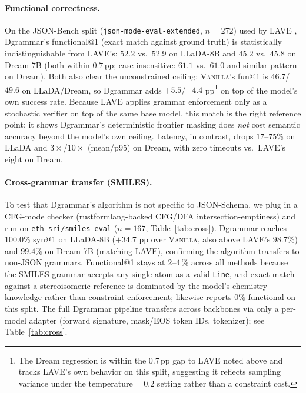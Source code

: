 \documentclass[11pt]{article}
\begin{document}
\paragraph{Functional correctness.} On the JSON-Bench split (\texttt{json-mode-eval-extended}, $n{=}272$) used by LAVE \citep{lave2025}, Dgrammar's functional@1 (exact match against ground truth) is statistically indistinguishable from LAVE's: $52.2$ vs.\ $52.9$ on LLaDA-8B and $45.2$ vs.\ $45.8$ on Dream-7B (both within $0.7$\,pp; case-insensitive: $61.1$ vs.\ $61.0$ and similar pattern on Dream). Both also clear the unconstrained ceiling: \textsc{Vanilla}'s fun@1 is $46.7$/$49.6$ on LLaDA/Dream, so Dgrammar adds $+5.5$/$-4.4$ pp\footnote{The Dream regression is within the $0.7$\,pp gap to LAVE noted above and tracks LAVE's own behavior on this split, suggesting it reflects sampling variance under the temperature$=$$0.2$ setting rather than a constraint cost.} on top of the model's own success rate. Because LAVE applies grammar enforcement only as a stochastic verifier on top of the same base model, this match is the right reference point: it shows Dgrammar's deterministic frontier masking does \emph{not} cost semantic accuracy beyond the model's own ceiling. Latency, in contrast, drops $17$--$75$\% on LLaDA and $3\times$/$10\times$ (mean/p95) on Dream, with zero timeouts vs.\ LAVE's eight on Dream.

\paragraph{Cross-grammar transfer (SMILES).} To test that Dgrammar's algorithm is not specific to JSON-Schema, we plug in a CFG-mode checker (rustformlang-backed CFG/DFA intersection-emptiness) and run on \texttt{eth-sri/smiles-eval} ($n{=}167$, Table~\ref{tab:cross}). Dgrammar reaches $100.0$\% syn@1 on LLaDA-8B ($+34.7$ pp over \textsc{Vanilla}, also above LAVE's $98.7$\%) and $99.4$\% on Dream-7B (matching LAVE), confirming the algorithm transfers to non-JSON grammars. Functional@1 stays at $2$--$4$\,\% across all methods because the SMILES grammar accepts any single atom as a valid \texttt{Line}, and exact-match against a stereoisomeric reference is dominated by the model's chemistry knowledge rather than constraint enforcement; \citet{lave2025} likewise reports $0$\% functional on this split. The full Dgrammar pipeline transfers across backbones via only a per-model adapter (forward signature, mask/EOS token IDs, tokenizer); see Table~\ref{tab:cross}.
\end{document}
